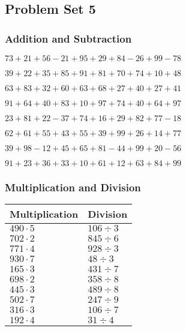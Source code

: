 \hypertarget{problem-set-5}{%
\subsection{Problem Set 5}\label{problem-set-5}}

\hypertarget{addition-and-subtraction}{%
\subsubsection{Addition and
Subtraction}\label{addition-and-subtraction}}

\(73+21+56-21+95+29+84-26+99-78\)

\(39+22+35+85+91+81+70+74+10+48\)

\(63+83+32+60+63+68+27+40+27+41\)

\(91+64+40+83+10+97+74+40+64+97\)

\(23+81+22-37+74+16+29+82+77-18\)

\(62+61+55+43+55+39+99+26+14+77\)

\(39+98-12+45+65+81-44+99+20-56\)

\(91+23+36+33+10+61+12+63+84+99\)

\hypertarget{multiplication-and-division}{%
\subsubsection{Multiplication and
Division}\label{multiplication-and-division}}

\begin{longtable}[]{@{}ll@{}}
\toprule
Multiplication & Division\tabularnewline
\midrule
\endhead
\(490\cdot5\) & \(106÷3\)\tabularnewline
\(702\cdot2\) & \(845÷6\)\tabularnewline
\(771\cdot4\) & \(928÷3\)\tabularnewline
\(930\cdot7\) & \(48÷3\)\tabularnewline
\(165\cdot3\) & \(431÷7\)\tabularnewline
\(698\cdot2\) & \(358÷8\)\tabularnewline
\(445\cdot3\) & \(489÷8\)\tabularnewline
\(502\cdot7\) & \(247÷9\)\tabularnewline
\(316\cdot3\) & \(106÷7\)\tabularnewline
\(192\cdot4\) & \(31 ÷4\)\tabularnewline
\bottomrule
\end{longtable}
